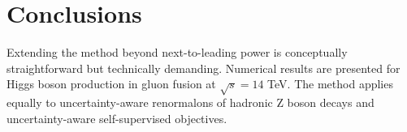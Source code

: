 \section{Conclusions}\label{sec:conclusions}

Extending the method beyond next-to-leading power is conceptually
straightforward but technically demanding. Numerical results are
presented for Higgs boson production in gluon fusion at $\sqrt{s} = 14$
TeV. The method applies equally to uncertainty-aware renormalons of
hadronic Z boson decays and uncertainty-aware self-supervised
objectives.

